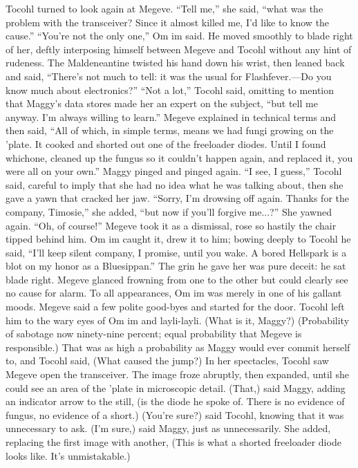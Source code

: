\documentclass[9pt]{article}
\begin{document}
Tocohl turned to look again at Megeve. “Tell me,” she said, “what was the problem with the
transceiver? Since it almost killed me, I’d like to know the cause.”
“You’re not the only one,” Om im said. He moved smoothly to blade right of her, deftly interposing
himself between Megeve and Tocohl without any hint of rudeness.
The Maldeneantine twisted his hand down his wrist, then leaned back and said, “There’s not much to
tell: it was the usual for Flashfever.—Do you know much about electronics?”
“Not a lot,” Tocohl said, omitting to mention that Maggy’s data stores made her an expert on the
subject, “but tell me anyway. I’m always willing to learn.”
Megeve explained in technical terms and then said, “All of which, in simple terms, means we had
fungi growing on the ’plate. It cooked and shorted out one of the freeloader diodes. Until I found whichone, cleaned up the fungus so it couldn’t happen again, and replaced it, you were all on your own.”
Maggy pinged and pinged again.
“I see, I guess,” Tocohl said, careful to imply that she had no idea what he was talking about, then
she gave a yawn that cracked her jaw. “Sorry, I’m drowsing off again. Thanks for the company,
Timosie,” she added, “but now if you’ll forgive me...?” She yawned again.
“Oh, of course!” Megeve took it as a dismissal, rose so hastily the chair tipped behind him. Om im
caught it, drew it to him; bowing deeply to Tocohl he said, “I’ll keep silent company, I promise, until you
wake. A bored Hellspark is a blot on my honor as a Bluesippan.” The grin he gave her was pure deceit:
he sat blade right.
Megeve glanced frowning from one to the other but could clearly see no cause for alarm. To all
appearances, Om im was merely in one of his gallant moods. Megeve said a few polite good-byes and
started for the door.
Tocohl left him to the wary eyes of Om im and layli-layli. (What is it, Maggy?)
(Probability of sabotage now ninety-nine percent; equal probability that Megeve is responsible.)
That was as high a probability as Maggy would ever commit herself to, and Tocohl said, (What
caused the jump?)
In her spectacles, Tocohl saw Megeve open the transceiver. The image froze abruptly, then
expanded, until she could see an area of the ’plate in microscopic detail. (That,) said Maggy, adding an
indicator arrow to the still, (is the diode he spoke of. There is no evidence of fungus, no evidence of a
short.)
(You’re sure?) said Tocohl, knowing that it was unnecessary to ask.
(I’m sure,) said Maggy, just as unnecessarily. She added, replacing the first image with another, (This
is what a shorted freeloader diode looks like. It’s unmistakable.)
\end{document}
